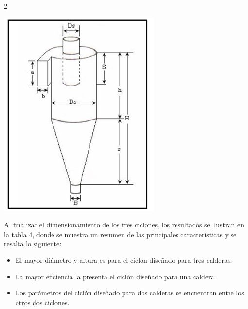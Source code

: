 \documentclass[12pt,spanish,Letterpaper,openany]{book}
\newcommand{\spacetenmilis}{\vspace{10mm}}
\begin{document}
\begin {multicols}{2}
\begin {flushleft}
\begin{minipage}[c]{\columnwidth}
\centering

\includegraphics[width=1\linewidth]{images/image12_wvaliente}

\end{minipage}

\end {flushleft}

\spacetenmilis
\spacetenmilis
\spacetenmilis
\spacetenmilis
\spacetenmilis

Al finalizar el dimensionamiento de los tres ciclones, los resultados se ilustran en la tabla 4, donde se muestra un resumen de las principales características y se resalta lo siguiente:

\spacetenmilis

\begin{itemize}
\item
  El mayor diámetro y altura es para el ciclón diseñado para tres calderas.
\item
  La mayor eficiencia la presenta el ciclón diseñado para una caldera.
\item
  Los parámetros del ciclón diseñado para dos calderas se encuentran entre los otros dos ciclones.
\end{itemize}


\end{multicols}
\end{document}
